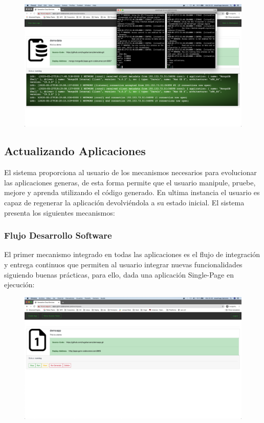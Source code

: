 \documentclass[a4paper,11pt]{book}
\begin{document}
\begin{figure}[H]
\centering
\includegraphics[scale=0.2]{imagenes/casouso/1_17.png}
\caption{   }
\end{figure}



\subsection{Actualizando Aplicaciones}

El sistema proporciona al usuario de los mecanismos necesarios para evolucionar las aplicaciones generas, de esta forma permite que el usuario manipule, pruebe, mejore y aprenda utilizando el código generado. En ultima instancia el usuario es capaz de regenerar la aplicación devolviéndola a su estado inicial. El sistema presenta los siguientes mecanismos:

\subsubsection{Flujo Desarrollo Software}

El primer mecanismo integrado en todas las aplicaciones es el flujo de integración y entrega continuos que permiten al usuario integrar nuevas funcionalidades siguiendo buenas prácticas, para ello, dada una aplicación Single-Page en ejecución:

\begin{figure}[H]
\centering
\includegraphics[scale=0.2]{imagenes/casouso/2_1.png}
\caption{   }
\end{figure}
\end{document}
